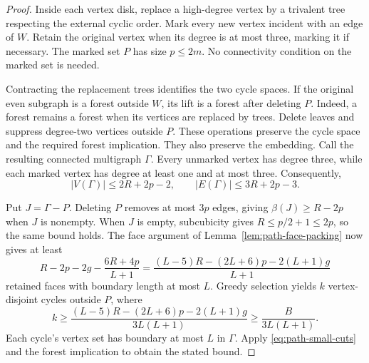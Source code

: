 \begin{proof}
Inside each vertex disk, replace a high-degree vertex by a trivalent tree respecting the external cyclic order.
Mark every new vertex incident with an edge of $W$.
Retain the original vertex when its degree is at most three, marking it if necessary.
The marked set $P$ has size $p\le2m$.
No connectivity condition on the marked set is needed.

Contracting the replacement trees identifies the two cycle spaces.
If the original even subgraph is a forest outside $W$, its lift is a forest after deleting $P$.
Indeed, a forest remains a forest when its vertices are replaced by trees.
Delete leaves and suppress degree-two vertices outside $P$.
These operations preserve the cycle space and the required forest implication.
They also preserve the embedding.
Call the resulting connected multigraph $\Gamma$.
Every unmarked vertex has degree three, while each marked vertex has degree at least one and at most three.
Consequently,
\[
 |V(\Gamma)|\le2R+2p-2,
 \qquad |E(\Gamma)|\le3R+2p-3.
\]

Put $J=\Gamma-P$.
Deleting $P$ removes at most $3p$ edges, giving $\beta(J)\ge R-2p$ when $J$ is nonempty.
When $J$ is empty, subcubicity gives $R\le p/2+1\le2p$, so the same bound holds.
The face argument of Lemma~\ref{lem:path-face-packing} now gives at least
\[
 R-2p-2g-\frac{6R+4p}{L+1}
 =\frac{(L-5)R-(2L+6)p-2(L+1)g}{L+1}
\]
retained faces with boundary length at most $L$.
Greedy selection yields $k$ vertex-disjoint cycles outside $P$, where
\[
 k\ge\frac{(L-5)R-(2L+6)p-2(L+1)g}{3L(L+1)}
 \ge\frac{B}{3L(L+1)}.
\]
Each cycle's vertex set has boundary at most $L$ in $\Gamma$.
Apply \eqref{eq:path-small-cuts} and the forest implication to obtain the stated bound.
\end{proof}

